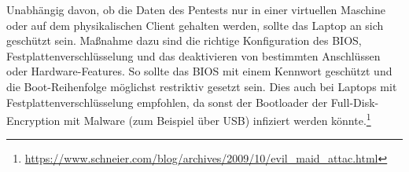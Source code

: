 		Unabhängig davon, ob die Daten des Pentests nur in einer virtuellen Maschine oder auf dem physikalischen Client gehalten werden, sollte das Laptop an sich geschützt sein. Maßnahme dazu sind die richtige Konfiguration des BIOS, Festplattenverschlüsselung und das deaktivieren von bestimmten Anschlüssen oder Hardware-Features. So sollte das BIOS mit einem Kennwort geschützt und die Boot-Reihenfolge möglichst restriktiv gesetzt sein. Dies auch bei Laptops mit Festplattenverschlüsselung empfohlen, da sonst der Bootloader der Full-Disk-Encryption mit Malware (zum Beispiel über USB) infiziert werden könnte.\footnote{\url{https://www.schneier.com/blog/archives/2009/10/evil_maid_attac.html}}

